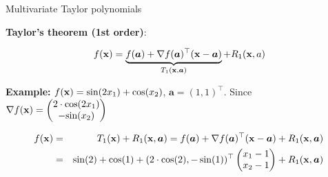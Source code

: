 \documentclass[11pt,compress,t,notes=noshow, xcolor=table]{beamer}
\begin{document}
\begin{vbframe}{Multivariate Taylor polynomials}

\textbf{Taylor's theorem (1st order)}: 

$$
  f(\mathbf{x}) = \underbrace{f(\bm{a}) + \nabla f(\bm{a})^\top (\mathbf{x} - \bm{a})}_{T_1(\mathbf{x}, \bm{a})} + R_1(\mathbf{x}, a) 
$$

\vspace*{-0.3cm}

\begin{footnotesize} \textbf{Example: } $f(\mathbf{x}) = \text{sin}(2x_1) + \text{cos}(x_2)$, $\bm{a} = (1, 1)^\top$. Since $\nabla f(\mathbf{x}) = \begin{pmatrix} 2\cdot\text{cos}(2x_1) \\ -\text{sin}(x_2) \end{pmatrix}$

\vspace*{-0.3cm}

\begin{eqnarray*}
  f(\mathbf{x}) &=& T_1(\mathbf{x}) + R_1(\mathbf{x}, \bm{a}) = f(\bm{a}) + \nabla f(\bm{a})^\top (\mathbf{x} - \bm{a}) + R_1(\mathbf{x}, \bm{a})\\ &=& \sin(2) + \cos(1) + (2 \cdot \cos(2), - \sin(1))^\top\begin{pmatrix} x_1 - 1 \\ x_2 - 1\end{pmatrix} + R_1(\mathbf{x}, \bm{a})
\end{eqnarray*}

\end{footnotesize}

\vspace*{-0.3cm}


\end{vbframe}
\end{document}

